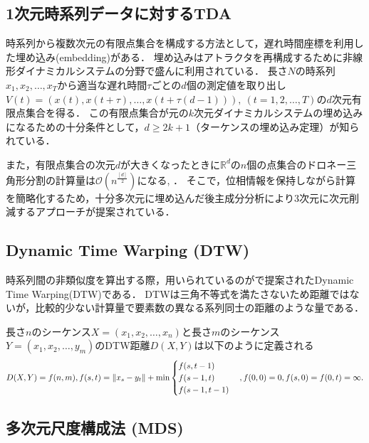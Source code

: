 \documentclass{jarticle}
\begin{document}
\subsection{1次元時系列データに対するTDA}
時系列から複数次元の有限点集合を構成する方法として，遅れ時間座標を利用した埋め込み(embedding)がある．
埋め込みはアトラクタを再構成するために非線形ダイナミカルシステムの分野で盛んに利用されている．
長さ$N$の時系列$x_1, x_2, \dots , x_T$から適当な遅れ時間$\tau$ごとの$d$個の測定値を取り出し$V(t) = (x(t), x(t+\tau), \dots, x(t + \tau(d - 1))),\ (t = 1,2,\dots, T)$の$d$次元有限点集合を得る．
この有限点集合が元の$k$次元ダイナミカルシステムの埋め込みになるための十分条件として，$d\geq 2k+1$（ターケンスの埋め込み定理\cite{Takens1981}）が知られている．

また，有限点集合の次元$d$が大きくなったときに$\mathbb R^d$の$n$個の点集合のドロネー三角形分割の計算量は$\mathcal O(n^{\frac{[d]}{2}})$になる\cite{Amenta2007}, \cite{Attali2003}．
そこで，位相情報を保持しながら計算を簡略化するため，十分多次元に埋め込んだ後主成分分析により3次元に次元削減するアプローチが提案されている\cite{Truong2017}．


\subsection{Dynamic Time Warping (DTW)}
時系列間の非類似度を算出する際，用いられているのが\cite{Berndt1996}で提案されたDynamic Time Warping(DTW)である．
DTWは三角不等式を満たさないため距離ではないが，比較的少ない計算量で要素数の異なる系列同士の距離のような量である．

長さ$n$のシーケンス$X=(x_1, x_2,\dots,x_n)$と長さ$m$のシーケンス$Y=(x_1, x_2,\dots,y_m)$のDTW距離$D(X, Y)$は以下のように定義される
\begin{equation}
D(X, Y) = f(n, m), \\
f(s, t) = \|x_s-y_t\| + {\rm min}
\begin{cases}
	f(s, t-1)\\
	f(s-1, t)\\
	f(s-1, t-1)
\end{cases},
 \\
f(0,0) = 0, f(s, 0) = f(0,t) = \infty.
\notag
\end{equation}



\subsection{多次元尺度構成法 (MDS)}
\end{document}
